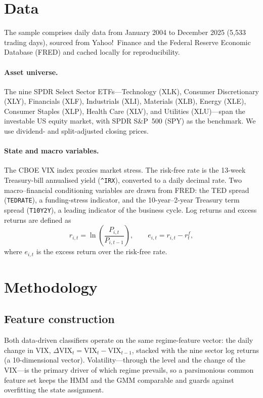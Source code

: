 \documentclass[12pt,a4paper]{article}
\newcommand{\dvix}{\Delta\mathrm{VIX}}
\newcommand{\rf}{r^{f}}
\begin{document}
\section{Data}\label{sec:data}
The sample comprises daily data from January 2004 to December 2025 (5{,}533 trading
days), sourced from Yahoo!\ Finance and the Federal Reserve Economic Database (FRED) and
cached locally for reproducibility.

\paragraph{Asset universe.}
The nine SPDR Select Sector ETFs---Technology (XLK), Consumer Discretionary (XLY),
Financials (XLF), Industrials (XLI), Materials (XLB), Energy (XLE), Consumer Staples
(XLP), Health Care (XLV), and Utilities (XLU)---span the investable US equity market,
with SPDR S\&P~500 (SPY) as the benchmark. We use dividend- and split-adjusted closing
prices.

\paragraph{State and macro variables.}
The CBOE VIX index proxies market stress. The risk-free rate is the 13-week
Treasury-bill annualised yield (\texttt{\textasciicircum IRX}), converted to a daily
decimal rate. Two macro--financial conditioning variables are drawn from FRED: the TED
spread (\texttt{TEDRATE}), a funding-stress indicator, and the 10-year--2-year Treasury
term spread (\texttt{T10Y2Y}), a leading indicator of the business cycle. Log returns and
excess returns are defined as
\begin{equation}
  r_{i,t}=\ln\!\left(\frac{P_{i,t}}{P_{i,t-1}}\right),
  \qquad
  e_{i,t}=r_{i,t}-\rf_t,
\end{equation}
where $e_{i,t}$ is the excess return over the risk-free rate.

\section{Methodology}\label{sec:method}

\subsection{Feature construction}
Both data-driven classifiers operate on the same regime-feature vector: the daily change
in VIX, $\dvix_t=\mathrm{VIX}_t-\mathrm{VIX}_{t-1}$, stacked with the nine sector log
returns (a 10-dimensional vector). Volatility---through the level and the change of the
VIX---is the primary driver of which regime prevails, so a parsimonious common feature set
keeps the HMM and the GMM comparable and guards against overfitting the state assignment.
\end{document}
